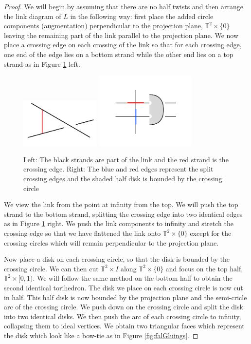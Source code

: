 \documentclass[11pt]{amsart}
\newcommand{\torus}{{\mathbb{T}^2}}
\theoremstyle{plain}
\theoremstyle{definition}
\begin{document}
\begin{proof}
We will begin by assuming that there are no half twists and then
arrange the link diagram of $L$ in the following way: first place the added
circle components (augmentation) perpendicular to the projection plane, $\torus
\times \{0\}$ leaving the remaining part of the link parallel to the projection
plane.  We now place a crossing edge on each crossing of the link so that for
each crossing edge, one end of the edge lies on a bottom strand while the other
end lies on a top strand as in Figure \ref{fig:crossingArc} left.

\begin{figure} 
\centering 
\includegraphics[width=4cm]{crossingArc}
\includegraphics[width=5cm]{crossingPush} 
\caption{Left: The black strands are
part of the link and the red strand is the crossing edge. Right: The blue and
red edges represent the split crossing edges and the shaded half disk is bounded
by the crossing circle} 
\label{fig:crossingArc} 
\end{figure}

\indent We view the link from the point at infinity from the top. We will push
the top strand to the bottom strand, splitting the crossing edge into two
identical edges as in Figure \ref{fig:crossingArc} right. We push the link
components to infinity and stretch the crossing edge so that we have flattened
the link onto $\torus \times \{0\}$ except for the crossing circles which will
remain perpendicular to the projection plane. 
 
\indent Now place a disk on each crossing circle, so that the disk is bounded by
the crossing circle. We can then cut $\torus \times I$ along $\torus \times \{0\}$ and
focus on the top half, $\torus \times [0,1)$. We will follow the same method on the
bottom half to obtain the second identical torihedron. The disk we place on each
crossing circle is now cut in half. This half disk is now bounded by the
projection plane and the semi-cricle arc of the crossing circle. We push down on
the crossing circle and split the disk into two identical disks. We then push
the arc of each crossing circle to infinity, collapsing them to ideal vertices.
We obtain two triangular faces which represent the disk which look like a
bow-tie as in Figure \ref{fig:falGluings}. 


\end{proof}
\end{document}
